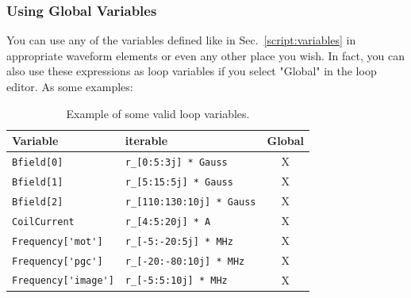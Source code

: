 \subsubsection{Using Global Variables}
You can use any of the variables defined like in Sec.~\ref{script:variables}
in appropriate waveform elements or even any other place you wish.  In fact,
you can also use these expressions as loop variables if you select "Global" in
the loop editor.  As some examples:

\begin{table}[ht!]
  \center
  \begin{tabular}{p{5cm} m{6cm}c}
  Variable                  &                iterable            &   Global\\
  \hline \hline
  \verb|Bfield[0]|          &       \verb|r_[0:5:3j] * Gauss|      &    X \\
  \verb|Bfield[1]|          &       \verb|r_[5:15:5j] * Gauss|     &    X \\
  \verb|Bfield[2]|          &       \verb|r_[110:130:10j] * Gauss| &    X \\
  \verb|CoilCurrent|        &       \verb|r_[4:5:20j] * A|         &    X \\
  \verb|Frequency['mot']|   &       \verb|r_[-5:-20:5j] * MHz|   &      X \\
  \verb|Frequency['pgc']|   &       \verb|r_[-20:-80:10j] * MHz| &      X \\
  \verb|Frequency['image']| &       \verb|r_[-5:5:10j] * MHz|    &      X \\
  \end{tabular}

  \caption{
    Example of some valid loop variables.
  }
\end{table}


